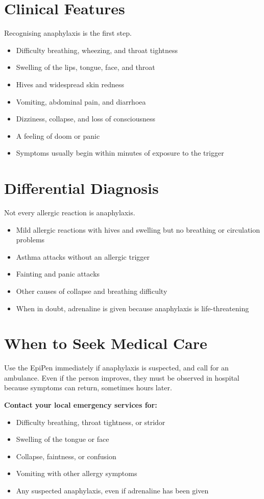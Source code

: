 \section*{Clinical Features}
Recognising anaphylaxis is the first step.
\begin{itemize}
    \item Difficulty breathing, wheezing, and throat tightness
    \item Swelling of the lips, tongue, face, and throat
    \item Hives and widespread skin redness
    \item Vomiting, abdominal pain, and diarrhoea
    \item Dizziness, collapse, and loss of consciousness
    \item A feeling of doom or panic
    \item Symptoms usually begin within minutes of exposure to the trigger
\end{itemize}

\section*{Differential Diagnosis}
Not every allergic reaction is anaphylaxis.
\begin{itemize}
    \item Mild allergic reactions with hives and swelling but no breathing or circulation problems
    \item Asthma attacks without an allergic trigger
    \item Fainting and panic attacks
    \item Other causes of collapse and breathing difficulty
    \item When in doubt, adrenaline is given because anaphylaxis is life-threatening
\end{itemize}

\section*{When to Seek Medical Care}
Use the EpiPen immediately if anaphylaxis is suspected, and call for an ambulance. Even if the person improves, they must be observed in hospital because symptoms can return, sometimes hours later.

\textbf{Contact your local emergency services for:}
\begin{itemize}
    \item Difficulty breathing, throat tightness, or stridor
    \item Swelling of the tongue or face
    \item Collapse, faintness, or confusion
    \item Vomiting with other allergy symptoms
    \item Any suspected anaphylaxis, even if adrenaline has been given
\end{itemize}

